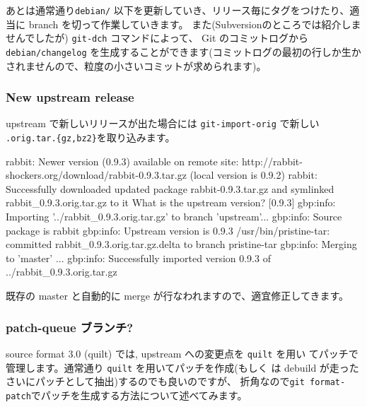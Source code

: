 \documentclass[mingoth,a4paper]{jsarticle}
\begin{document}
あとは通常通り{\tt{debian/}} 以下を更新していき、リリース毎にタグをつけたり、適当に branch を切って作業していきます。
また(Subversionのところでは紹介しませんでしたが) {\tt{git-dch}} コマンドによって、
Git のコミットログから {\tt{debian/changelog}} を生成することができます(コミットログの最初の行しか生かされませんので、粒度の小さいコミットが求められます)。

\subsubsection{New upstream release}

upstream で新しいリリースが出た場合には {\tt{git-import-orig}} で新しい {\tt{.orig.tar.\{gz,bz2\}}}を取り込みます。
\begin{commandline}
  rabbit: Newer version (0.9.3) available on remote site:
    http://rabbit-shockers.org/download/rabbit-0.9.3.tar.gz
    (local version is 0.9.2)
  rabbit: Successfully downloaded updated package rabbit-0.9.3.tar.gz
      and symlinked rabbit_0.9.3.orig.tar.gz to it
  What is the upstream version? [0.9.3]
  gbp:info: Importing '../rabbit_0.9.3.orig.tar.gz' to branch 'upstream'...
  gbp:info: Source package is rabbit
  gbp:info: Upstream version is 0.9.3
  /usr/bin/pristine-tar: committed rabbit_0.9.3.orig.tar.gz.delta to branch pristine-tar
  gbp:info: Merging to 'master'
  ...
  gbp:info: Successfully imported version 0.9.3 of ../rabbit_0.9.3.orig.tar.gz
\end{commandline}
既存の master と自動的に merge が行なわれますので、適宜修正してきます。

\subsubsection{patch-queue ブランチ?}

source format 3.0 (quilt) では, upstream への変更点を {\tt{quilt}} を用い
てパッチで管理します。通常通り {\tt{quilt}} を用いてパッチを作成(もしく
は debuild が走ったさいにパッチとして抽出)するのでも良いのですが、
折角なので{\tt{git format-patch}}でパッチを生成する方法について述べてみます。
\end{document}
